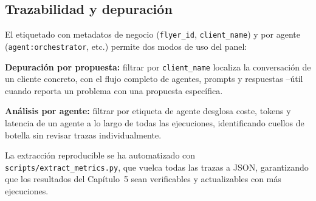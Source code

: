 \subsection{Trazabilidad y depuración}
El etiquetado con metadatos de negocio (\texttt{flyer\_id}, \texttt{client\_name}) y por agente (\texttt{agent:orchestrator}, etc.) permite dos modos de uso del panel:

\begin{tfmbullets}
\item \textbf{Depuración por propuesta:} filtrar por \texttt{client\_name} localiza la conversación de un cliente concreto, con el flujo completo de agentes, prompts y respuestas --útil cuando reporta un problema con una propuesta específica.
\item \textbf{Análisis por agente:} filtrar por etiqueta de agente desglosa coste, tokens y latencia de un agente a lo largo de todas las ejecuciones, identificando cuellos de botella sin revisar trazas individualmente.
\end{tfmbullets}

La extracción reproducible se ha automatizado con \texttt{scripts/extract\_metrics.py}, que vuelca todas las trazas a JSON, garantizando que los resultados del Capítulo~5 sean verificables y actualizables con más ejecuciones.
